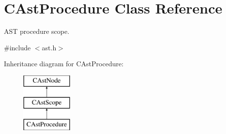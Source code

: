 \hypertarget{classCAstProcedure}{\section{C\-Ast\-Procedure Class Reference}
\label{classCAstProcedure}
}


A\-S\-T procedure scope.  




{\ttfamily \#include $<$ast.\-h$>$}

Inheritance diagram for C\-Ast\-Procedure\-:\begin{figure}[H]
\begin{center}
\leavevmode
\includegraphics[height=3.000000cm]{classCAstProcedure}
\end{center}
\end{figure}
